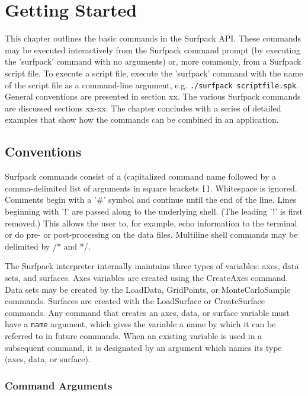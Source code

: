 \documentclass{article}
\begin{document}
\section{Getting Started}
This chapter outlines the basic commands in the Surfpack API.  These commands may be executed interactively from the Surfpack command prompt (by executing the 'surfpack' command with no arguments) or, more commonly, from a Surfpack script file.  To execute a script file, execute the 'surfpack' command with the name of the script file as a command-line argument, e.g.
\texttt{./surfpack scriptfile.spk}.  General conventions are presented in section xx.  The various Surfpack commands are discussed sections xx-xx.  The chapter concludes with a series of detailed examples that show how the commands can be combined in an application.

\subsection{Conventions}
Surfpack commands consist of a (capitalized command name followed by a
comma-delimited list of arguments in square brackets \texttt{[]}.
Whitespace is ignored.  Comments begin with a '\#' symbol and continue until the end of the line.  Lines beginning with '!' are passed along to the underlying shell.  (The leading '!' is first removed.)  This allows the user to, for example, echo information to the terminal or do pre- or post-processing on the data files.  Multiline shell commands may be delimited by /* and */.

The Surfpack interpreter internally maintains three types of variables: axes, data sets, and surfaces.  Axes variables are created using the CreateAxes command.  Data sets may be created by the LoadData, GridPoints, or MonteCarloSample commands.  Surfaces are created with the LoadSurface or CreateSurface commands.  Any command that creates an axes, data, or surface variable must have a \texttt{name} argument, which gives the variable a name by which it can be referred to in future commands.  When an existing variable is used in a subsequent command, it is designated by an argument which names its type (axes, data, or surface).  



\subsubsection{Command Arguments}\label{sec:arguments}
\end{document}
